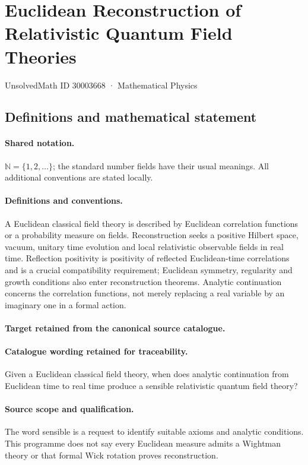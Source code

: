 \documentclass[11pt]{article}
\begin{document}
\setcounter{section}{30003667}
\section{Euclidean Reconstruction of Relativistic Quantum Field Theories}\label{30003668}
{\small UnsolvedMath ID 30003668 · Mathematical Physics}
\subsection{Definitions and mathematical statement}

\paragraph{Shared notation.}$\mathbb N=\{1,2,\ldots\}$; the standard number fields have their usual meanings. All additional conventions are stated locally.


\paragraph{Definitions and conventions.}
A Euclidean classical field theory is described by Euclidean correlation functions or a probability measure on fields. Reconstruction seeks a positive Hilbert space, vacuum, unitary time evolution and local relativistic observable fields in real time. Reflection positivity is positivity of reflected Euclidean-time correlations and is a crucial compatibility requirement; Euclidean symmetry, regularity and growth conditions also enter reconstruction theorems. Analytic continuation concerns the correlation functions, not merely replacing a real variable by an imaginary one in a formal action.

\paragraph{Target retained from the canonical source catalogue.}
\paragraph{Catalogue wording retained for traceability.}
Given a Euclidean classical field theory, when does analytic continuation from Euclidean time to real time produce a sensible relativistic quantum field theory?

\paragraph{Source scope and qualification.}
The word sensible is a request to identify suitable axioms and analytic conditions. This programme does not say every Euclidean measure admits a Wightman theory or that formal Wick rotation proves reconstruction.
\end{document}
